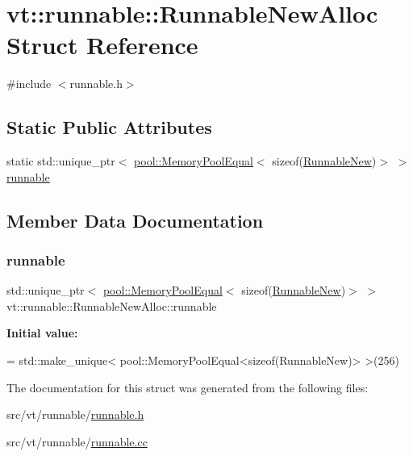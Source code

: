 \hypertarget{structvt_1_1runnable_1_1_runnable_new_alloc}{}\section{vt\+:\+:runnable\+:\+:Runnable\+New\+Alloc Struct Reference}
\label{structvt_1_1runnable_1_1_runnable_new_alloc}


{\ttfamily \#include $<$runnable.\+h$>$}

\subsection*{Static Public Attributes}
\begin{DoxyCompactItemize}
\item 
static std\+::unique\+\_\+ptr$<$ \hyperlink{structvt_1_1pool_1_1_memory_pool_equal}{pool\+::\+Memory\+Pool\+Equal}$<$ sizeof(\hyperlink{structvt_1_1runnable_1_1_runnable_new}{Runnable\+New})$>$ $>$ \hyperlink{structvt_1_1runnable_1_1_runnable_new_alloc_acec458ff78bea4438946ebadac54d52f}{runnable}
\end{DoxyCompactItemize}


\subsection{Member Data Documentation}
\mbox{\label{structvt_1_1runnable_1_1_runnable_new_alloc_acec458ff78bea4438946ebadac54d52f}} 
\subsubsection{\texorpdfstring{runnable}{runnable}}
{\footnotesize\ttfamily std\+::unique\+\_\+ptr$<$ \hyperlink{structvt_1_1pool_1_1_memory_pool_equal}{pool\+::\+Memory\+Pool\+Equal}$<$ sizeof(\hyperlink{structvt_1_1runnable_1_1_runnable_new}{Runnable\+New})$>$ $>$ vt\+::runnable\+::\+Runnable\+New\+Alloc\+::runnable\hspace{0.3cm}{\ttfamily [static]}}

{\bfseries Initial value\+:}
\begin{DoxyCode}
= std::make\_unique<
  pool::MemoryPoolEqual<sizeof(RunnableNew)>
>(256)
\end{DoxyCode}


The documentation for this struct was generated from the following files\+:\begin{DoxyCompactItemize}
\item 
src/vt/runnable/\hyperlink{runnable_8h}{runnable.\+h}\item 
src/vt/runnable/\hyperlink{runnable_8cc}{runnable.\+cc}\end{DoxyCompactItemize}
